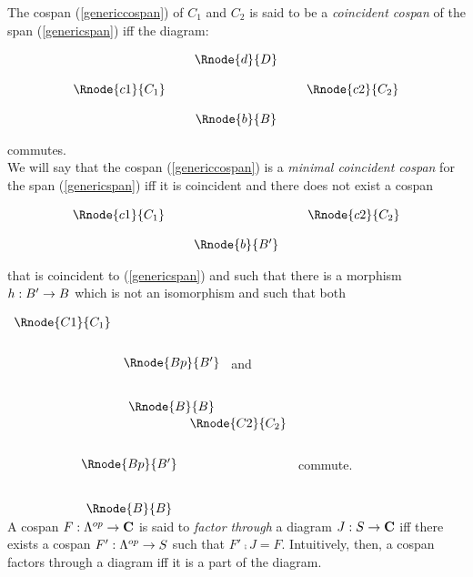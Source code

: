 \documentclass[10pt,a4paper]{scrartcl}
\begin{document}
\noindent
The cospan (\ref{genericcospan}) of $C_1$ and $C_2$ is said to be a 
\textit{coincident cospan} of the span (\ref{genericspan}) iff the 
diagram:
\begin{center}
\begin{equation}
\begin{array}{cp{0.1cm}cp{0.1cm} c}
            & &\Rnode{d}{D}                           \\ [0.4cm]
\Rnode{c1}{C_1}& &                & & \Rnode{c2}{C_2} \\ [0.4cm]
            & &\Rnode{b}{B}
\end{array}
\end{equation}
\end{center}

\noindent commutes. \\

\noindent We will say that the cospan (\ref{genericcospan}) is a 
\textit{minimal coincident cospan} for the span (\ref{genericspan}) iff it is 
coincident  and there does not exist a cospan 
\begin{center}
\begin{equation}
\begin{array}{cp{0.1cm}cp{0.1cm} c}
\Rnode{c1}{C_1}& &                & & \Rnode{c2}{C_2} \\ [0.4cm]
            & &\Rnode{b}{B'}
\end{array}
\end{equation}
\end{center}

\noindent
that is coincident to (\ref{genericspan}) and such that there is a morphism 
$h: B' \rightarrow B$ which is not an isomorphism and such that both \\
\vspace {0.25cm}

$
\begin{array}{cc}
\Rnode{C1}{C_1}                             \\ [0.7cm]
               & \Rnode{Bp}{B'}             \\ [0.8cm]
							 &  \Rnode{B}{B} 
\end{array}
$
and
$
\begin{array}{p{1.5cm}cc}
&                &\Rnode{C2}{C_2}     \\ [0.7cm]
&\Rnode{Bp}{B'}                       \\ [0.8cm]
&\Rnode{B}{B}
\end{array}
$
commute. \\
\noindent
A cospan $F:\Lambda^{op} \rightarrow \textbf{C}$ is said to \textit{factor through}  a diagram 
$J:S \rightarrow \textbf{C}$ iff there exists a cospan $F': \Lambda^{op} \rightarrow S$ 
such that $F' \comp J = F$. Intuitively, then, a cospan factors through a diagram iff it is a 
part of the diagram.
  
\end{document}
